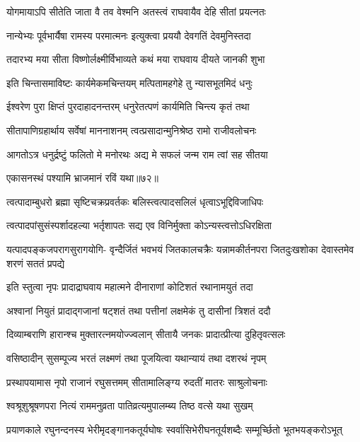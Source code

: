 \twolineshloka
{योगमायाऽपि सीतेति जाता वै तव वेश्मनि}
{अतस्त्वं राघवायैव देहि सीतां प्रयत्नतः} %

\twolineshloka
{नान्येभ्यः पूर्वभार्यैषा रामस्य परमात्मनः}
{इत्युक्त्वा प्रययौ देवगतिं देवमुनिस्तदा} %

\twolineshloka
{तदारभ्य मया सीता विष्णोर्लक्ष्मीर्विभाव्यते}
{कथं मया राघवाय दीयते जानकी शुभा} %

\twolineshloka
{इति चिन्तासमाविष्टः कार्यमेकमचिन्तयम्}
{मत्पितामहगेहे तु न्यासभूतमिदं धनुः} %

\twolineshloka
{ईश्वरेण पुरा क्षिप्तं पुरदाहादनन्तरम्}
{धनुरेतत्पणं कार्यमिति चिन्त्य कृतं तथा} %

\twolineshloka
{सीतापाणिग्रहार्थाय सर्वेषां माननाशनम्}
{त्वत्प्रसादान्मुनिश्रेष्ठ रामो राजीवलोचनः} %

\twolineshloka
{आगतोऽत्र धनुर्द्रष्टुं फलितो मे मनोरथः}
{अद्य मे सफलं जन्म राम त्वां सह सीतया} %

{एकासनस्थं पश्यामि भ्राजमानं रविं यथा॥७२॥} %


\twolineshloka
{त्वत्पादाम्बुधरो ब्रह्मा सृष्टिचक्रप्रवर्तकः}
{बलिस्त्वत्पादसलिलं धृत्वाऽभूद्दिविजाधिपः} %

\twolineshloka
{त्वत्पादपांसुसंस्पर्शादहल्या भर्तृशापतः}
{सद्य एव विनिर्मुक्ता कोऽन्यस्त्वत्तोऽधिरक्षिता} %

\fourlineindentedshloka
{यत्पादपङ्कजपरागसुरागयोगि-}
{वृन्दैर्जितं भवभयं जितकालचक्रैः}
{यन्नामकीर्तनपरा जितदुःखशोका}
{देवास्तमेव शरणं सततं प्रपद्ये} %

\twolineshloka
{इति स्तुत्वा नृपः प्रादाद्राघवाय महात्मने}
{दीनाराणां कोटिशतं रथानामयुतं तदा} %

\twolineshloka
{अश्वानां नियुतं प्रादाद्गजानां षट्शतं तथा}
{पत्तीनां लक्षमेकं तु दासीनां त्रिशतं ददौ} %

\twolineshloka
{दिव्याम्बराणि हारान्श्च मुक्तारत्नमयोज्ज्वलान्}
{सीतायै जनकः प्रादात्प्रीत्या दुहितृवत्सलः} %

\twolineshloka
{वसिष्ठादीन् सुसम्पूज्य भरतं लक्ष्मणं तथा}
{पूजयित्वा यथान्यायं तथा दशरथं नृपम्} %

\twolineshloka
{प्रस्थापयामास नृपो राजानं रघुसत्तमम्}
{सीतामालिङ्ग्य रुदतीं मातरः साश्रुलोचनाः} %

\twolineshloka
{श्वश्रूशुश्रूषणपरा नित्यं राममनुव्रता}
{पातिव्रत्यमुपालम्ब्य तिष्ठ वत्से यथा सुखम्} %

\twolineshloka
{प्रयाणकाले रघुनन्दनस्य भेरीमृदङ्गानकतूर्यघोषः}
{स्वर्वासिभेरीघनतूर्यशब्दैः सम्मूर्च्छितो भूतभयङ्करोऽभूत्} %

